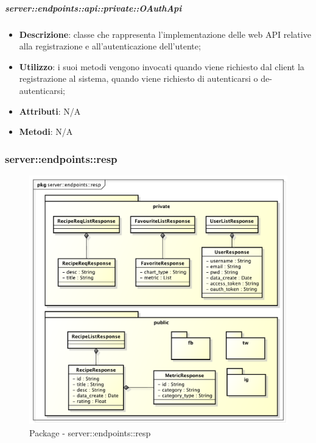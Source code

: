 	\subparagraph{server::endpoints::api::private::OAuthApi} %
    \label{subp:bdsm_app_server_endpoints_api_private_oauthapi}
    \begin{itemize}
      	\item \textbf{Descrizione}: classe che rappresenta l'implementazione delle web API relative alla registrazione e all'autenticazione dell'utente;
      	\item \textbf{Utilizzo}: i suoi metodi vengono invocati quando viene richiesto dal client la registrazione al sistema, quando viene richiesto di autenticarsi o de-autenticarsi;
		\item \textbf{Attributi}: N/A
		\item \textbf{Metodi}: N/A
    \end{itemize}

\subsubsection{server::endpoints::resp} %
\label{ssub:bdsm_app_server_endpoints_resp}
\begin{figure}[!htbp]
	\centering
	\centerline{\includegraphics[scale=0.45]{./images/server/resp.pdf}}
	\caption{Package - server::endpoints::resp}
\end{figure}

